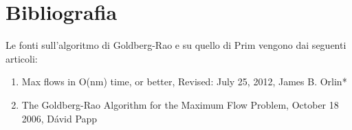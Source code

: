 \documentclass[a4paper, 11pt]{report}
\begin{document}
\chapter*{Bibliografia}
    Le fonti sull'algoritmo di Goldberg-Rao e su quello di Prim vengono dai seguenti articoli:
   \begin{enumerate}
    \item  Max flows in O(nm) time, or better, Revised: July 25, 2012, James B. Orlin*
    \item The Goldberg-Rao Algorithm for the Maximum Flow Problem, October 18 2006, Dávid Papp
   \end{enumerate}
\end{document}
